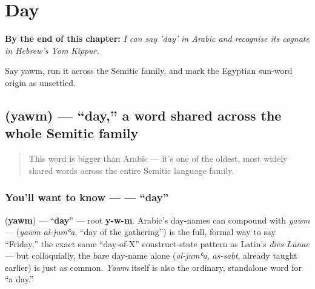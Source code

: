 
\chapter{Day}
\label{ch:ar-day}

\begin{chapteropening}
\textbf{By the end of this chapter:} \emph{I can say 'day' in Arabic and recognise its cognate in Hebrew's Yom Kippur.}

Say yawm, run it across the Semitic family, and mark the Egyptian sun-word origin as unsettled.
\end{chapteropening}

\section[\texorpdfstring{\ar{يوم} (yawm)}{يوم (yawm)}]{ (yawm) — \textquotedblleft{}day,\textquotedblright{} a word shared across the whole Semitic family}

\label{lesson:AR-C25-yawm}



\begin{quote}
This word is bigger than Arabic — it's one of the oldest, most widely shared words across the entire Semitic language family.
\end{quote}

\subsection*{You'll want to know —  — \textquotedblleft{}day\textquotedblright{}}
\textbf{} (\textbf{yawm}) — \textquotedblleft{}\textbf{day}\textquotedblright{} — root \textbf{y-w-m}. Arabic's day-names can compound with \emph{yawm} — \textbf{ } (\emph{yawm al-jumʿa}, \textquotedblleft{}day of the gathering\textquotedblright{}) is the full, formal way to say \textquotedblleft{}Friday,\textquotedblright{} the exact same \textquotedblleft{}day-of-X\textquotedblright{} construct-state pattern as Latin's \emph{diēs Lūnae} — but colloquially, the bare day-name alone (\emph{al-jumʿa}, \emph{as-sabt}, already taught earlier) is just as common. \emph{Yawm} itself is also the ordinary, standalone word for \textquotedblleft{}a day.\textquotedblright{}

